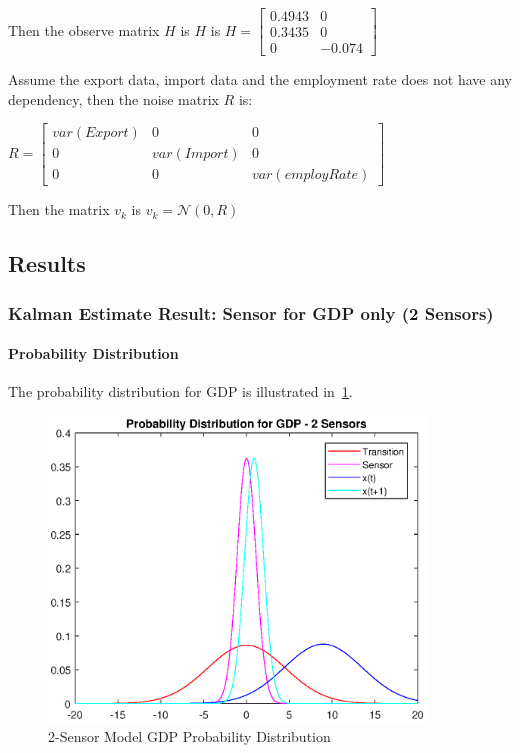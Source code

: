 \documentclass[11pt, a4paper]{article}
\begin{document}
Then the observe matrix $H$ is $H$ is $H = \begin{bmatrix} 0.4943 & 0 \\ 0.3435 & 0 \\ 0 & -0.074  \end{bmatrix}$


Assume the export data, import data and the employment rate does not have any dependency, then the noise matrix $R$ is:

\begin{center}
	$R = \begin{bmatrix} var(Export) & 0 & 0 \\ 0 & var(Import) & 0 \\ 0 & 0 & var(employRate)  \end{bmatrix}$
\end{center}

Then the matrix $v_k$ is $v_k = \mathcal{N}(0,R)$

\subsection{Results}

\subsubsection{Kalman Estimate Result: Sensor for GDP only (2 Sensors)}


\paragraph{Probability Distribution}

The probability distribution for GDP is illustrated in~\ref{fig:pd_1}.

\begin{figure}[htbp]
	
	\centering 
	\includegraphics[width=10cm]{pd_1}
	
	\caption{2-Sensor Model GDP Probability Distribution}
	\label{fig:pd_1}
	
\end{figure}
\end{document}
